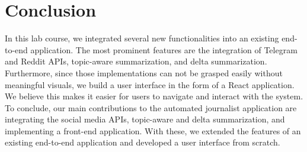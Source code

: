 \section{Conclusion}\label{sec:conclusion}
In this lab course, we integrated several new functionalities into an existing end-to-end application. The most prominent features are the integration of Telegram and Reddit APIs, topic-aware summarization, and delta summarization. Furthermore, since those implementations can not be grasped easily without meaningful visuals, we build a user interface in the form of a React application. We believe this makes it easier for users to navigate and interact with the system. \\
To conclude, our main contributions to the automated journalist application are integrating the social media APIs, topic-aware and delta summarization, and implementing a front-end application. With these, we extended the features of an existing end-to-end application and developed a user interface from scratch. 